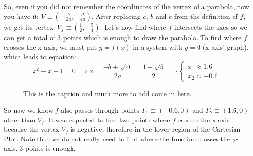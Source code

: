 So, even if you did not remember
the coordinates of the vertex
of a parabola, now you have
it: $V \equiv \left( -\frac{b}{2a}, - \frac{\Delta}{4a} \right)$.
After replacing
$a$, $b$ and $c$ from the definition of $f$, we get its vertex:
$V_f \equiv \left( \frac{1}{2}, - \frac{5}{4} \right)$.
Let's now find where $f$ intersects the axes so we can get a total of 3 points
which is enough to draw the parabola. To find where $f$ crosses the x-axis,
we must put $y = f(x)$ in a system with $y = 0$ (x-axis' graph), which leads to
equation:
\begin{equation*}
    x^2 - x - 1 = 0 \implies x = \frac{-b \pm \sqrt{\Delta}}{2a} =
    \frac{1 \pm \sqrt{5}}{2} \implies
    \begin{cases}
        x_1 \approx 1.6\\
        x_2 \approx -0.6
    \end{cases}
\end{equation*}

\begin{figure*}[h] %
    \caption{This is the caption and much more to add come in here.}%
    \label{fig:fplot}%
\end{figure*}

So now we know $f$ also passes through points $F_1 \equiv (-0.6,0)$ and
$F_2 \equiv (1.6,0)$ other than $V_f$. It was expected to find two points
where $f$ crosses the x-axis because the vertex $V_f$ is negative, therefore
in the lower region of the Cartesian Plot. Note that we do not really need
to find where the function crosses the y-axis, 3 points is
enough.

